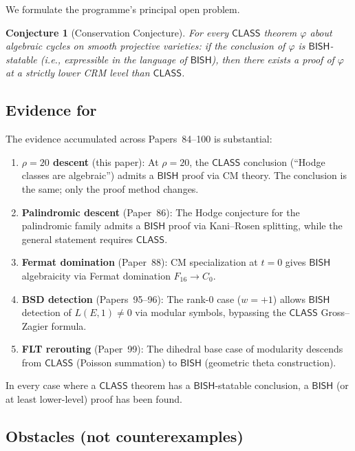 \documentclass[11pt,a4paper]{article}
\theoremstyle{plain}
\newtheorem{conjecture}[theorem]{Conjecture}
\theoremstyle{definition}
\newcommand{\BISH}{\textsf{BISH}}
\newcommand{\CLASS}{\textsf{CLASS}}
\begin{document}
We formulate the programme's principal open problem.

\begin{conjecture}[Conservation Conjecture]\label{conj:conservation}
For every $\CLASS$ theorem $\varphi$ about algebraic cycles on smooth projective varieties:
if the conclusion of $\varphi$ is $\BISH$-statable (i.e., expressible in the language of $\BISH$),
then there exists a proof of $\varphi$ at a strictly lower CRM level than $\CLASS$.
\end{conjecture}

\subsection{Evidence for}

The evidence accumulated across Papers~84--100 is substantial:

\begin{enumerate}[label=(\roman*)]
  \item \textbf{$\rho = 20$ descent} (this paper): At $\rho = 20$, the $\CLASS$ conclusion (``Hodge classes are algebraic'') admits a $\BISH$ proof via CM theory. The conclusion is the same; only the proof method changes.

  \item \textbf{Palindromic descent} (Paper~86): The Hodge conjecture for the palindromic family admits a $\BISH$ proof via Kani--Rosen splitting, while the general statement requires $\CLASS$.

  \item \textbf{Fermat domination} (Paper~88): CM specialization at $t = 0$ gives $\BISH$ algebraicity via Fermat domination $F_{16} \to C_0$.

  \item \textbf{BSD detection} (Papers~95--96): The rank-0 case ($w = +1$) allows $\BISH$ detection of $L(E,1) \neq 0$ via modular symbols, bypassing the $\CLASS$ Gross--Zagier formula.

  \item \textbf{FLT rerouting} (Paper~99): The dihedral base case of modularity descends from $\CLASS$ (Poisson summation) to $\BISH$ (geometric theta construction).
\end{enumerate}

In every case where a $\CLASS$ theorem has a $\BISH$-statable conclusion, a $\BISH$ (or at least lower-level) proof has been found.

\subsection{Obstacles (not counterexamples)}
\end{document}
